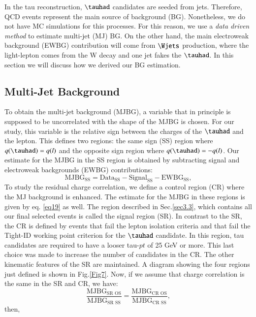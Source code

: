 In the tau reconstruction, $\tauhad$ candidates are seeded from jets. Therefore, QCD events represent the main source of background (BG). Nonetheless, we do not have MC simulations for this processes. For this reason, we use a \textit{data driven method} to estimate multi-jet (MJ) BG. On the other hand, the main electroweak background (EWBG) contribution will come from $\Wjets$ production, where the light-lepton comes from the W decay and one jet fakes the $\tauhad$. In this section we will discuss how we derived our BG estimation.

\subsection{Multi-Jet Background}
To obtain the multi-jet background (MJBG), a variable that in principle is supposed to be uncorrelated with the shape of the MJBG is chosen. For our study, this variable is the relative sign between the charges of the $\tauhad$ and the lepton. This defines two regions: the same sign (SS) region where $q(\tauhad)=q(l)$ and the opposite sign region where $q(\tauhad)=-q(l)$. Our estimate for the MJBG in the SS region is obtained by subtracting signal and electroweak backgrounds (EWBG) contributions:
\begin{equation}
\text{MJBG}_{\text{SS}}=\text{Data}_{\text{SS}}-\text{Signal}_{\text{SS}}-\text{EWBG}_{\text{SS}},
\label{eq19}
\end{equation}
To study the residual charge correlation, we define a control region (CR) where the MJ background is enhanced. The estimate for the MJBG in these regions is given by eq. \ref{eq19} as well. The region described in Sec.\ref{sec3.3}, which contains all our final selected events is called the signal region (SR). In contrast to the SR, the CR is defined by events that fail the lepton isolation criteria and that fail the Tight-ID working point criterion for the $\tauhad$ candidate. In this region, tau candidates are required to have a looser tau-$pt$ of 25 GeV or more. This last choice was made to increase the number of candidates in the CR. The other kinematic features of the SR are maintained. A diagram showing the four regions just defined is shown in Fig.\ref{Fig7}. Now, if we assume that charge correlation is the same in the SR and CR, we have:
 \begin{equation}
 \frac{\text{MJBG}_{\text{SR OS}}}{\text{MJBG}_{\text{SR SS}}}=\frac{\text{MJBG}_{\text{CR OS}}}{\text{MJBG}_{\text{CR SS}}},
 \end{equation}
then,
